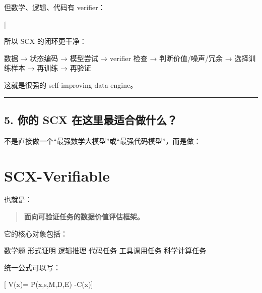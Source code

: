 \documentclass[
  12pt,
]{ctexart}
\newenvironment{Shaded}{}{}
\newcommand{\NormalTok}[1]{#1}
\begin{document}
但数学、逻辑、代码有 verifier：

{[}  \rightarrow {}
\rightarrow \text{pass/fail}{]}

所以 SCX 的闭环更干净：

\begin{Shaded}
\begin{Highlighting}[]
\NormalTok{数据}
\NormalTok{→ 状态编码}
\NormalTok{→ 模型尝试}
\NormalTok{→ verifier 检查}
\NormalTok{→ 判断价值/噪声/冗余}
\NormalTok{→ 选择训练样本}
\NormalTok{→ 再训练}
\NormalTok{→ 再验证}
\end{Highlighting}
\end{Shaded}

这就是很强的 self-improving data engine。

\begin{center}\rule{0.5\linewidth}{0.5pt}\end{center}

\subsection{5. 你的 SCX
在这里最适合做什么？}\label{ux4f60ux7684-scx-ux5728ux8fd9ux91ccux6700ux9002ux5408ux505aux4ec0ux4e48}

不是直接做一个``最强数学大模型''或``最强代码模型''，而是做：

\section{\texorpdfstring{\textbf{SCX-Verifiable}}{SCX-Verifiable}}\label{scx-verifiable}

也就是：

\begin{quote}
\textbf{面向可验证任务的数据价值评估框架。}
\end{quote}

它的核心对象包括：

\begin{Shaded}
\begin{Highlighting}[]
\NormalTok{数学题}
\NormalTok{形式证明}
\NormalTok{逻辑推理}
\NormalTok{代码任务}
\NormalTok{工具调用任务}
\NormalTok{科学计算任务}
\end{Highlighting}
\end{Shaded}

统一公式可以写：

{[} V(x)=
P(\mid x,s,\mathcal M,\mathcal D,\mathcal E)
-\lambda C(x){]}
\end{document}
